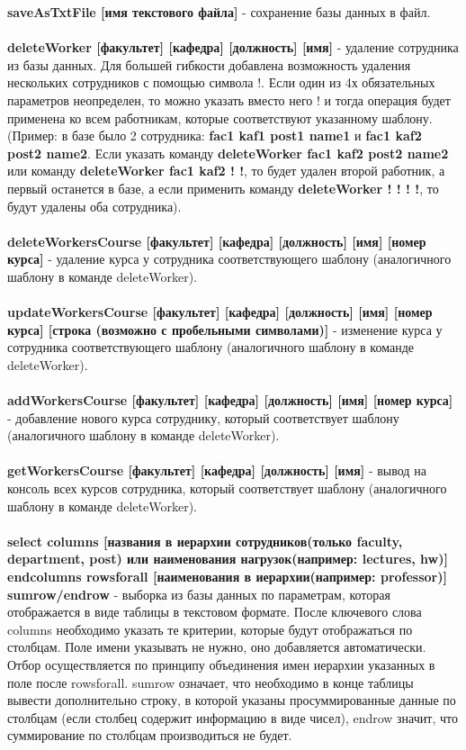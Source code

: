 \documentclass[11pt]{article}
\begin{document}
\textbf{saveAsTxtFile [имя текстового файла]} - сохранение базы данных в файл.\\\\
\textbf{deleteWorker [факультет] [кафедра] [должность] [имя]} - удаление сотрудника из базы данных. Для большей гибкости добавлена возможность удаления нескольких сотрудников с помощью символа !. Если один из 4х обязательных параметров неопределен, то можно указать вместо него ! и тогда операция будет применена ко всем работникам, которые соответствуют указанному шаблону. (Пример: в базе было 2 сотрудника: \textbf{fac1 kaf1 post1 name1} и \textbf{fac1 kaf2 post2 name2}. Если указать команду \textbf{deleteWorker fac1 kaf2 post2 name2} или команду \textbf{deleteWorker fac1 kaf2 ! !}, то будет удален второй работник, а первый останется в базе, а если применить команду \textbf{deleteWorker ! ! ! !}, то будут удалены оба сотрудника).\\\\
\textbf{deleteWorkersCourse [факультет] [кафедра] [должность] [имя] [номер курса]} - удаление курса у сотрудника соответствующего шаблону (аналогичного шаблону в команде deleteWorker).\\\\
\textbf{updateWorkersCourse [факультет] [кафедра] [должность] [имя] [номер курса] [строка (возможно с пробельными символами)]} - изменение курса у сотрудника соответствующего шаблону (аналогичного шаблону в команде deleteWorker).\\\\
\textbf{addWorkersCourse [факультет] [кафедра] [должность] [имя] [номер курса]} - добавление нового курса  сотруднику, который соответствует шаблону (аналогичного шаблону в команде deleteWorker).\\\\
\textbf{getWorkersCourse [факультет] [кафедра] [должность] [имя]} - вывод на консоль всех курсов сотрудника, который соответствует шаблону (аналогичного шаблону в команде deleteWorker).\\\\
\textbf{select columns [названия в иерархии сотрудников(только faculty, department, post) или наименования нагрузок(например: lectures, hw)] end\textunderscore{}columns rows\textunderscore{}for\textunderscore{}all [наименования в иерархии(например: professor)] sum\textunderscore{}row/end\textunderscore{}row} - выборка из базы данных по параметрам, которая отображается в виде таблицы в текстовом формате. После ключевого слова columns необходимо указать те критерии, которые будут отображаться по столбцам. Поле имени указывать не нужно, оно добавляется автоматически. Отбор осуществляется по принципу объединения имен иерархии указанных в поле после rows\textunderscore{}for\textunderscore{}all. sum\textunderscore{}row означает, что необходимо в конце таблицы вывести дополнительно строку, в которой указаны просуммированные данные по столбцам (если столбец содержит информацию в виде чисел), end\textunderscore{}row значит, что суммирование по столбцам производиться не будет.
\end{document}
